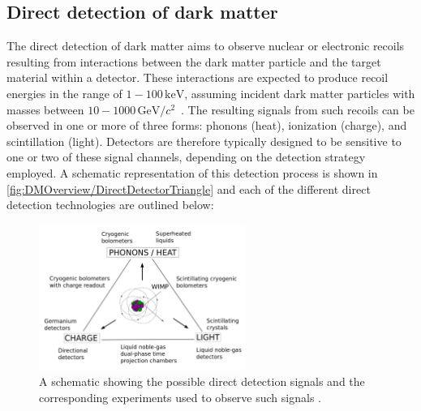 \subsection{Direct detection of dark matter}\label{sec:DMOverview/DirectDetection}
The direct detection of dark matter aims to observe nuclear or electronic recoils resulting from interactions between the dark matter particle and the target material within a detector. These interactions are expected to produce recoil energies in the range of $1-100\,\mathrm{keV}$, assuming incident dark matter particles with masses between $10-1000\,\mathrm{GeV}/c^2$~\cite{DirectDetection2015}. The resulting signals from such recoils can be observed in one or more of three forms: phonons (heat), ionization (charge), and scintillation (light). Detectors are therefore typically designed to be sensitive to one or two of these signal channels, depending on the detection strategy employed. A schematic representation of this detection process is shown in \autoref{fig:DMOverview/DirectDetectorTriangle} and each of the different direct detection technologies are outlined below:
\begin{figure}[ht!]
	\centering
	\includegraphics[width=0.6\textwidth]{figures/DMOverview/Direct_direction.png}
	\caption[A schematic showing the possible direct detection signals with corresponding experiments.]{A schematic showing the possible direct detection signals and the corresponding experiments used to observe such signals \cite{DirectDetection2015}.}
	\label{fig:DMOverview/DirectDetectorTriangle}
\end{figure}
